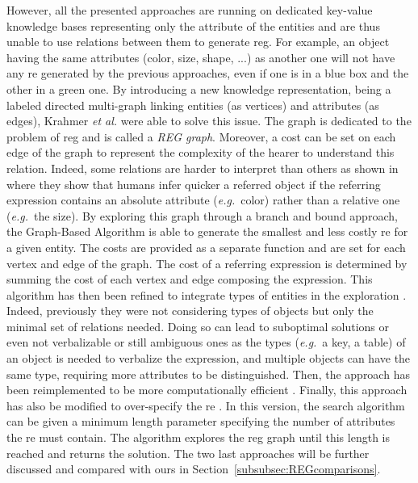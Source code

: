 \documentclass[a4paper,11pt,twoside]{StyleThese}
\begin{document}
However, all the presented approaches are running on dedicated key-value knowledge bases representing only the attribute of the entities and are thus unable to use relations between them to generate \acrshort{reg}. For example, an object having the same attributes (color, size, shape, ...) as another one will not have any \acrshort{re} generated by the previous approaches, even if one is in a blue box and the other in a green one. By introducing a new knowledge representation, being a labeled directed multi-graph linking entities (as vertices) and attributes (as edges), Krahmer \textit{et al.} were able to solve this issue. The graph is dedicated to the problem of \acrshort{reg} and is called a \textit{REG graph}. Moreover, a cost can be set on each edge of the graph to represent the complexity of the hearer to understand this relation. Indeed, some relations are harder to interpret than others as shown in \cite{belke2002tracking} where they show that humans infer quicker a referred object if the referring expression contains an absolute attribute (\textit{e.g.}~color) rather than a relative one (\textit{e.g.}~the size). By exploring this graph through a branch and bound approach, the Graph-Based Algorithm \cite{krahmer2003graph} is able to generate the smallest and less costly \acrshort{re} for a given entity. The costs are provided as a separate function and are set for each vertex and edge of the graph. The cost of a referring expression is determined by summing the cost of each vertex and edge composing the expression. This algorithm has then been refined to integrate types of entities in the exploration \cite{krahmer2012computational}. Indeed, previously they were not considering types of objects but only the minimal set of relations needed. Doing so can lead to suboptimal solutions or even not verbalizable or still ambiguous ones as the types (\textit{e.g.}~a key, a table) of an object is needed to verbalize the expression, and multiple objects can have the same type, requiring more attributes to be distinguished. Then, the approach has been reimplemented to be more computationally efficient \cite{li2017automatically}. Finally, this approach has also be modified to over-specify the \acrshort{re} \cite{viethen2013graphs}. In this version, the search algorithm can be given a minimum length parameter specifying the number of attributes the \acrshort{re} must contain. The algorithm explores the \acrshort{reg} graph until this length is reached and returns the solution. The two last approaches will be further discussed and compared with ours in Section~\ref{subsubsec:REGcomparisons}.
\end{document}
